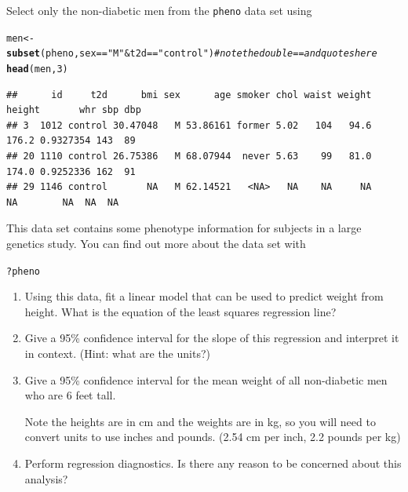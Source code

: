 \documentclass[twoside]{book}\usepackage[]{graphicx}\usepackage[]{xcolor}
\makeatletter
\newcommand{\hlnum}[1]{\textcolor[rgb]{0.686,0.059,0.569}{#1}}%
\newcommand{\hlstr}[1]{\textcolor[rgb]{0.192,0.494,0.8}{#1}}%
\newcommand{\hlcom}[1]{\textcolor[rgb]{0.678,0.584,0.686}{\textit{#1}}}%
\newcommand{\hlopt}[1]{\textcolor[rgb]{0,0,0}{#1}}%
\newcommand{\hlstd}[1]{\textcolor[rgb]{0.345,0.345,0.345}{#1}}%
\newcommand{\hlkwb}[1]{\textcolor[rgb]{0.69,0.353,0.396}{#1}}%
\newcommand{\hlkwd}[1]{\textcolor[rgb]{0.737,0.353,0.396}{\textbf{#1}}}%
\newenvironment{kframe}{%
 \def\at@end@of@kframe{}%
 \ifinner\ifhmode%
  \def\at@end@of@kframe{\end{minipage}}%
  \begin{minipage}{\columnwidth}%
 \fi\fi%
 \def\FrameCommand##1{\hskip\@totalleftmargin \hskip-\fboxsep
 \colorbox{shadecolor}{##1}\hskip-\fboxsep
     \hskip-\linewidth \hskip-\@totalleftmargin \hskip\columnwidth}%
 \MakeFramed {\advance\hsize-\width
   \@totalleftmargin\z@ \linewidth\hsize
   \@setminipage}}%
 {\par\unskip\endMakeFramed%
 \at@end@of@kframe}
\newenvironment{knitrout}{}{} %
\newcommand{\Rindex}[1]{\index{\texttt{#1}}}
\newcommand{\dataframe}[1]{{\color{blue!80!black}\texttt{#1}}\Rindex{#1}}
\makeatother
\begin{document}
\begin{problem}
	Select only the non-diabetic men from the \dataframe{pheno} data set using
\begin{knitrout}
\color{fgcolor}\begin{kframe}
\begin{alltt}
\hlstd{men} \hlkwb{<-} \hlkwd{subset}\hlstd{(pheno, sex}\hlopt{==}\hlstr{"M"} \hlopt{&} \hlstd{t2d}\hlopt{==}\hlstr{"control"}\hlstd{)}  \hlcom{# note the double == and quotes here}
\hlkwd{head}\hlstd{(men,}\hlnum{3}\hlstd{)}
\end{alltt}
\begin{verbatim}
##      id     t2d      bmi sex      age smoker chol waist weight height       whr sbp dbp
## 3  1012 control 30.47048   M 53.86161 former 5.02   104   94.6  176.2 0.9327354 143  89
## 20 1110 control 26.75386   M 68.07944  never 5.63    99   81.0  174.0 0.9252336 162  91
## 29 1146 control       NA   M 62.14521   <NA>   NA    NA     NA     NA        NA  NA  NA
\end{verbatim}
\end{kframe}
\end{knitrout}
This data set contains some phenotype information for subjects in
a large genetics study.  You can find out more about the data set with
\begin{knitrout}
\color{fgcolor}\begin{kframe}
\begin{alltt}
\hlopt{?}\hlstd{pheno}
\end{alltt}
\end{kframe}
\end{knitrout}
\begin{enumerate}
	\item
		Using this data, fit a linear model that can be used 
		to predict weight from height.  What is the equation 
		of the least squares regression line?
	\item
		Give a 95\% confidence interval for the slope of this regression
		and interpret it in context.  (Hint: what are the units?)
	\item
		Give a 95\% confidence interval for the mean weight of all 
		non-diabetic men who are 6 feet tall.  
		
		Note the heights are in cm and the weights are in kg, so you will need to convert 
		units to use inches and pounds.  (2.54 cm per inch, 2.2 pounds per kg)
	\item
		Perform regression diagnostics.  Is there any reason to be concerned
		about this analysis?
\end{enumerate}

\end{problem}
\end{document}
